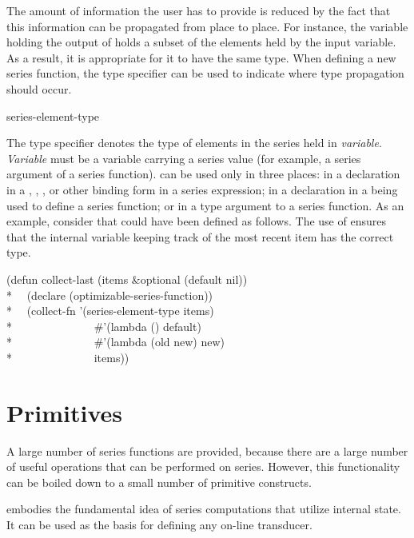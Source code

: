 The amount of information the user has to provide is reduced by the fact
that this information can be propagated from place to place.  For instance,
the variable holding the output of  holds a subset of the
elements held by the input variable.  As a result, it is appropriate for it
to have the same type.  When defining a new series function, the type
specifier  can be used to indicate where type
propagation should occur.

\begin{defun}
series-element-type

The type specifier  denotes the
type of elements in the series held in {\it variable}.  {\it Variable} must
be a variable carrying a series value (for example, a series argument of a series
function).   can be used only in three places: in
a declaration in a , , , or other
binding form in a series expression; in a declaration in a 
being used to define a series function; or in a type argument to a series
function.  As an example, consider that  could have been
defined as follows.  The use of  ensures that the
internal variable keeping track of the most recent item has the correct
type.
\begin{lisp}
(defun collect-last (items \&optional (default nil)) \\*
~~(declare (optimizable-series-function)) \\*
~~(collect-fn '(series-element-type items) \\*
~~~~~~~~~~~~~~\#'(lambda () default) \\*
~~~~~~~~~~~~~~\#'(lambda (old new) new) \\*
~~~~~~~~~~~~~~items))
\end{lisp}
\end{defun}

\section{Primitives}

A large number of series functions are provided, because there are a
large number of useful operations that can be performed on series.
However, this functionality can be boiled down to a small
number of primitive constructs.

 embodies the fundamental idea of series computations
that utilize internal state.  It can be used as the basis for defining any
on-line transducer.

